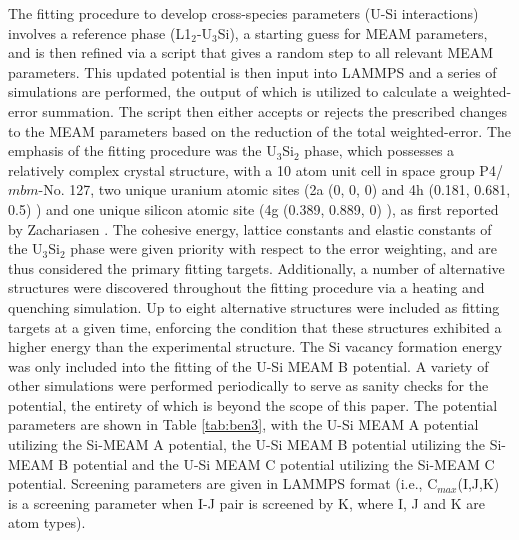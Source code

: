 \documentclass[review]{elsarticle}
\begin{document}
The fitting procedure to develop cross-species parameters (U-Si interactions) involves a reference phase (L1$_{2}$-U$_{3}$Si), a starting guess for MEAM parameters, and is then refined via a script that gives a random step to all relevant MEAM parameters.  This updated potential is then input into LAMMPS \cite{plimpton1995} and a series of simulations are performed, the output of which is utilized to calculate a weighted-error summation.  The script then either accepts or rejects the prescribed changes to the MEAM parameters based on the reduction of the total weighted-error.  The emphasis of the fitting procedure was the U$_{3}$Si$_{2}$ phase, which possesses a relatively complex crystal structure, with a 10 atom unit cell in space group P4/$\textit{mbm}$-No. 127, two unique uranium atomic sites (2a (0, 0, 0) and 4h (0.181, 0.681, 0.5) ) and one unique silicon atomic site (4g (0.389, 0.889, 0) ), as first reported by Zachariasen \cite{zachariasen1949}.  The cohesive energy, lattice constants and elastic constants of the U$_{3}$Si$_{2}$ phase were given priority with respect to the error weighting, and are thus considered the primary fitting targets.  Additionally, a number of alternative structures were discovered throughout the fitting procedure via a heating and quenching simulation.  Up to eight alternative structures were included as fitting targets at a given time, enforcing the condition that these structures exhibited a higher energy than the experimental structure.  The Si vacancy formation energy was only included into the fitting of the U-Si MEAM B potential.  A variety of other simulations were performed periodically to serve as sanity checks for the potential, the entirety of which is beyond the scope of this paper.  The potential parameters are shown in Table \ref{tab:ben3}, with the U-Si MEAM A potential utilizing the Si-MEAM A potential, the U-Si MEAM B potential utilizing the Si-MEAM B potential and the U-Si MEAM C potential utilizing the Si-MEAM C potential.  Screening parameters are given in LAMMPS format (i.e., C$_{max}$(I,J,K) is a screening parameter when I-J pair is screened by K, where I, J and K are atom types).  
\end{document}
